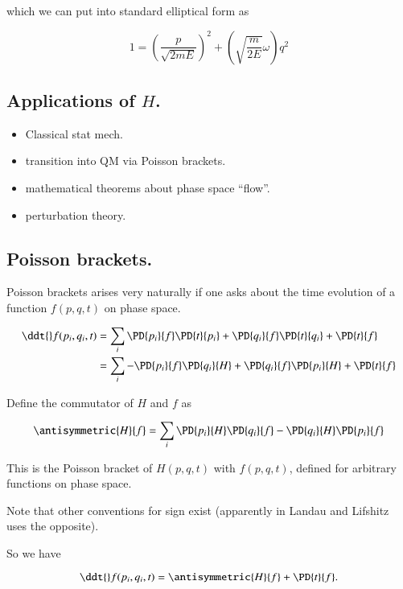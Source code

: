 which we can put into standard elliptical form as

\begin{equation}\label{eqn:phaseSpaceAndTrajectories:50}
1 = \left( \frac{p}{\sqrt{2 m E}}\right)^2 + \left(\sqrt{\frac{m}{2 E}} \omega\right) q^2
\end{equation}

\subsection{Applications of $H$.}

\begin{itemize}
\item Classical stat mech.
\item transition into QM via Poisson brackets.
\item mathematical theorems about phase space ``flow''.
\item perturbation theory.
\end{itemize}

\subsection{Poisson brackets.}

Poisson brackets arises very naturally if one asks about the time evolution of a function $f(p, q, t)$ on phase space.

\begin{align*}
\ddt{} f(p_i, q_i, t)
&=
\sum_i
 \PD{p_i}{f} \PD{t}{p_i}
+ \PD{q_i}{f} \PD{t}{q_i}
+ \PD{t}{f} \\
&=
\sum_i
- \PD{p_i}{f} \PD{q_i}{H}
+ \PD{q_i}{f} \PD{p_i}{H}
+ \PD{t}{f}
\end{align*}

Define the commutator of $H$ and $f$ as

\begin{equation}\label{eqn:phaseSpaceAndTrajectories:70}
\antisymmetric{H}{f} =
\sum_i
\PD{p_i}{H}
\PD{q_i}{f}
-
\PD{q_i}{H}
\PD{p_i}{f}
\end{equation}

This is the Poisson bracket of $H(p,q,t)$ with $f(p,q,t)$, defined for arbitrary functions on phase space.

Note that other conventions for sign exist (apparently in Landau and Lifshitz uses the opposite).

So we have

\begin{equation}\label{eqn:phaseSpaceAndTrajectories:90}
\ddt{} f(p_i, q_i, t) = \antisymmetric{H}{f} + \PD{t}{f}.
\end{equation}

